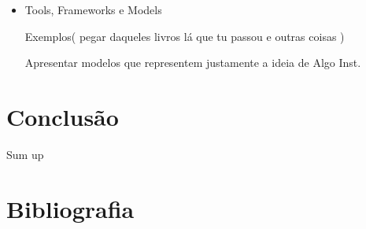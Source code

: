 \documentclass{article}
\begin{document}
\begin{itemize}

\item Tools, Frameworks e Models

    \subitem Exemplos( pegar daqueles livros lá que tu passou e outras coisas )
    
        Apresentar modelos que representem justamente a ideia de Algo Inst.

\end{itemize}

\section{ Conclusão }

Sum up

\newpage

\section*{ Bibliografia }
\end{document}
